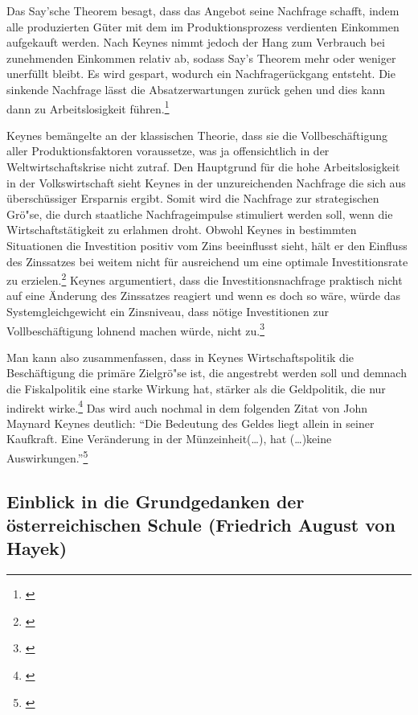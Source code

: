 \documentclass[
        onecolumn,
        a4paper,
        abstracton,
        parskip=half
        ,final
        ]{scrartcl}
\begin{document}
Das Say'sche Theorem besagt, dass das Angebot seine Nachfrage schafft, indem alle produzierten G{\"u}ter mit dem im Produktionsprozess verdienten Einkommen aufgekauft werden. Nach Keynes nimmt jedoch der Hang zum Verbrauch bei zunehmenden Einkommen relativ ab, sodass Say's Theorem mehr oder weniger unerf{\"u}llt bleibt. Es wird gespart, wodurch ein Nachfrager{\"u}ckgang entsteht. Die sinkende Nachfrage l{\"a}sst die Absatzerwartungen zur{\"u}ck gehen und dies kann dann zu Arbeitslosigkeit f{\"u}hren.\footnote[604]{\citep*[S.203]{peters2000}} 

Keynes bem{\"a}ngelte an der klassischen Theorie, dass sie die Vollbesch{\"a}ftigung aller Produktionsfaktoren voraussetze, was ja offensichtlich in der Weltwirtschaftskrise nicht zutraf. Den Hauptgrund f{\"u}r die hohe Arbeitslosigkeit in der Volkswirtschaft sieht Keynes in der unzureichenden Nachfrage die sich aus {\"u}bersch{\"u}ssiger Ersparnis ergibt. Somit wird die Nachfrage zur strategischen Gr{\"o}{"s}e, die durch staatliche Nachfrageimpulse stimuliert werden soll, wenn die Wirtschaftst{\"a}tigkeit zu erlahmen droht. Obwohl Keynes in bestimmten Situationen die Investition positiv vom Zins beeinflusst sieht, h{\"a}lt er den Einfluss des Zinssatzes bei weitem nicht f{\"u}r ausreichend um eine optimale Investitionsrate zu erzielen.\footnote[605]{\citep*[S.208]{peters2000}}
Keynes argumentiert, dass die Investitionsnachfrage praktisch nicht auf eine {\"A}nderung des Zinssatzes reagiert und wenn es doch so w{\"a}re, w{\"u}rde das Systemgleichgewicht
ein Zinsniveau, dass n{\"o}tige Investitionen zur Vollbesch{\"a}ftigung lohnend machen w{\"u}rde,
nicht zu.\footnote[606]{ \citep*[S.174]{bombach1981theorie}}

Man kann also zusammenfassen, dass in Keynes Wirtschaftspolitik die Besch{\"a}ftigung die prim{\"a}re Zielgr{\"o}{"s}e ist, die angestrebt werden soll und demnach die Fiskalpolitik
eine starke Wirkung hat, st{\"a}rker als die Geldpolitik, die nur indirekt wirke.\footnote[607]{ \citep*[S.181]{bombach1981theorie}}
Das wird auch nochmal in dem folgenden Zitat von John Maynard Keynes deutlich: "`Die Bedeutung des Geldes liegt allein in seiner Kaufkraft. Eine Ver{\"a}nderung in der M{\"u}nzeinheit(\ldots), hat (\ldots)keine Auswirkungen."'\footnote[608]{\citep*[S.1]{Keynes1997}}

\subsection{Einblick in die Grundgedanken der {\"o}sterreichischen Schule (Friedrich August von Hayek)} %
\end{document}
